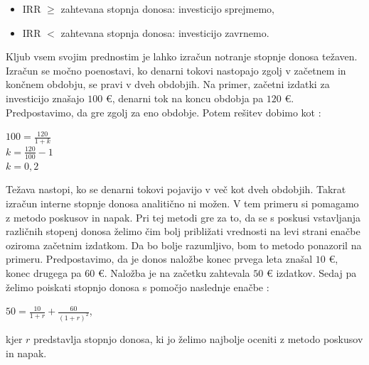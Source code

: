 \begin{itemize}
\item IRR $\geq$ zahtevana stopnja donosa: investicijo sprejmemo,
\item IRR $<$ zahtevana stopnja donosa: investicijo zavrnemo.
\end{itemize}


Kljub vsem svojim prednostim je lahko izračun notranje stopnje donosa težaven. Izračun se močno poenostavi, ko denarni tokovi nastopajo zgolj v začetnem in končnem obdobju, se pravi v dveh obdobjih. Na primer, začetni izdatki za investicijo znašajo $100$ €, denarni tok na koncu obdobja pa $120$ €. Predpostavimo, da gre zgolj za eno obdobje. Potem rešitev dobimo kot \cite[str. 157]{Mramor}:\\

\begin{center}
$100 = \tfrac{120}{1+k}$\\[0,5cm]
$k = \tfrac{120}{100} - 1$\\[0,5 cm]
$k = 0,2$
\end{center}

Težava nastopi, ko se denarni tokovi pojavijo v več kot dveh obdobjih. Takrat izračun interne stopnje donosa analitično ni možen. V tem primeru si pomagamo z metodo poskusov in napak. Pri tej metodi gre za to, da se s poskusi vstavljanja različnih stopenj donosa želimo čim bolj približati vrednosti na levi strani enačbe oziroma začetnim izdatkom. Da bo bolje razumljivo, bom to metodo ponazoril na primeru. Predpostavimo, da je donos naložbe konec prvega leta znašal $10$ €, konec drugega pa $60$ €. Naložba je na začetku zahtevala $50$ € izdatkov. Sedaj pa želimo poiskati stopnjo donosa s pomočjo naslednje enačbe \cite[str. 158]{Mramor}:\\

\begin{center}
$50 = \tfrac{10}{1+r} + \tfrac{60}{(1+r)^2}$,
\end{center}
kjer $r$ predstavlja stopnjo donosa, ki jo želimo najbolje oceniti z metodo poskusov in napak.

